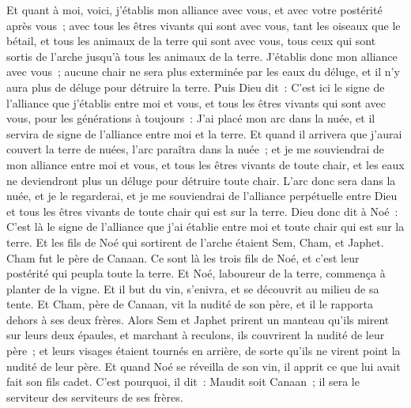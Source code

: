 \begin{multicols}{2}
Et quant à moi, voici, j'établis mon alliance avec vous, et avec votre postérité après vous~;
avec tous les êtres vivants qui sont avec vous, tant les oiseaux que le bétail, et tous les animaux de la terre qui sont avec vous, tous ceux qui sont sortis de l'arche jusqu'à tous les animaux de la terre.
J'établis donc mon alliance avec vous~; aucune chair ne sera plus exterminée par les eaux du déluge, et il n'y aura plus de déluge pour détruire la terre.
Puis Dieu dit~: C'est ici le signe de l'alliance que j'établis entre moi et vous, et tous les êtres vivants qui sont avec vous, pour les générations à toujours~:
J'ai placé mon arc dans la nuée, et il servira de signe de l'alliance entre moi et la terre.
Et quand il arrivera que j'aurai couvert la terre de nuées, l'arc paraîtra dans la nuée~;
et je me souviendrai de mon alliance entre moi et vous, et tous les êtres vivants de toute chair, et les eaux ne deviendront plus un déluge pour détruire toute chair.
L'arc donc sera dans la nuée, et je le regarderai, et je me souviendrai de l'alliance perpétuelle entre Dieu et tous les êtres vivants de toute chair qui est sur la terre.
Dieu donc dit à Noé~: C'est là le signe de l'alliance que j'ai établie entre moi et toute chair qui est sur la terre.
Et les fils de Noé qui sortirent de l'arche étaient Sem, Cham, et Japhet. Cham fut le père de Canaan.
Ce sont là les trois fils de Noé, et c'est leur postérité qui peupla toute la terre.
Et Noé, laboureur de la terre, commença à planter de la vigne.
Et il but du vin, s'enivra, et se découvrit au milieu de sa tente.
Et Cham, père de Canaan, vit la nudité de son père, et il le rapporta dehors à ses deux frères.
Alors Sem et Japhet prirent un manteau qu'ils mirent sur leurs deux épaules, et marchant à reculons, ils couvrirent la nudité de leur père~; et leurs visages étaient tournés en arrière, de sorte qu'ils ne virent point la nudité de leur père.
Et quand Noé se réveilla de son vin, il apprit ce que lui avait fait son fils cadet.
C'est pourquoi, il dit~: Maudit soit Canaan~; il sera le serviteur des serviteurs de ses frères.

\end{multicols}
